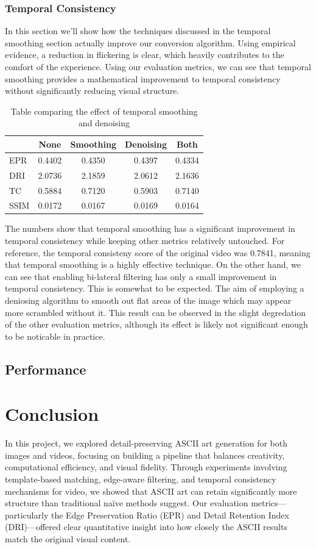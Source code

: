 \documentclass[10pt,twocolumn,letterpaper]{article}
\begin{document}
\subsubsection{Temporal Consistency}
In this section we’ll show how the techniques discussed in the temporal smoothing section actually improve our conversion algorithm. Using empirical evidence, a reduction in flickering is clear, which heavily contributes to the comfort of the experience. Using our evaluation metrics, we can see that temporal smoothing provides a mathematical improvement to temporal consistency without significantly reducing visual structure.

\begin{table}[H]
\centering
\begin{tabular}{l|cccc}
      &  None & Smoothing  & Denoising & Both \\ \hline
EPR & 0.4402     & 0.4350    & 0.4397  & 0.4334   \\
DRI & 2.0736     & 2.1859     & 2.0612  & 2.1636   \\
TC & 0.5884     & 0.7120     & 0.5903 & 0.7140    \\
SSIM & 0.0172 & 0.0167 & 0.0169 & 0.0164 	\\
\end{tabular}
\caption{Table comparing the effect of temporal smoothing and denoising}
\label{tab:dualheaders}
\end{table}

The numbers show that temporal smoothing has a significant improvement in temporal consistency while keeping other metrics relatively untouched. For reference, the temporal consisteny score of the original video was 0.7841, meaning that temporal smoothing is a highly effective technique. On the other hand, we can see that enabling bi-lateral filtering has only a small improvement in temporal consistency. This is somewhat to be expected. The aim of employing a deniosing algorithm to smooth out flat areas of the image which may appear more scrambled without it. This result can be observed in the slight degredation of the other evaluation metrics, although its effect is likely not significant enough to be noticable in practice.

\subsection{Performance}


\section{Conclusion}
In this project, we explored detail-preserving ASCII art generation for both images and videos, focusing on building a pipeline that balances creativity, computational efficiency, and visual fidelity. Through experiments involving template-based matching, edge-aware filtering, and temporal consistency mechanisms for video, we showed that ASCII art can retain significantly more structure than traditional naïve methods suggest. Our evaluation metrics—particularly the Edge Preservation Ratio (EPR) and Detail Retention Index (DRI)—offered clear quantitative insight into how closely the ASCII results match the original visual content.
\end{document}
